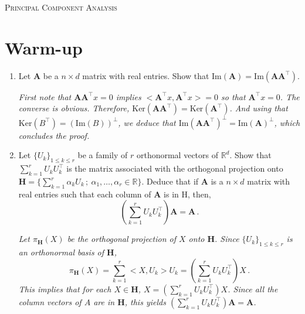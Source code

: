 \documentclass[a4paper,10pt,fleqn]{article}
\newcommand{\eqsp}{\,}
\newcommand{\rset}{\ensuremath{\mathbb{R}}}
\newcommand{\1}{\ensuremath{\mathbbm{1}}}
\newcommand{\bfA}{\mathbf{A}}
\begin{document}

\noindent\hrulefill

\begin{center}
\textsc{Principal Component Analysis}
\end{center}
\hrulefill

\medskip


\section*{Warm-up}

\begin{enumerate}
\item Let $\bfA$ be a $n\times d$ matrix with real entries. Show that $\mathrm{Im}(\bfA)=\mathrm{Im}(\bfA \bfA^\top)$.

\vspace{.2cm}

{\em
    First note that $\bfA\bfA^\top x=0$ implies $<\bfA^\top x,\bfA^\top x>=0$ so that $\bfA^\top x=0$. The converse is obvious. Therefore, $\mathrm{Ker}(\bfA \bfA^\top)= \mathrm{Ker}(\bfA^\top)$. And using that $\mathrm{Ker}(B^\top)=(\mathrm{Im}(B))^\perp$, we deduce that $\mathrm{Im}(\bfA \bfA^\top)^\perp=\mathrm{Im}(\bfA)^\perp$, which concludes the proof.
}
    
\item Let $\{U_k\}_{1\leq k \leq r}$ be a family of $r$ orthonormal vectors of $\rset^d$.
Show that $\sum_{k=1}^{r} U_k U_k^\top$ is the matrix associated with the orthogonal projection onto $\mathbf{H}=\{\sum_{k=1}^r \alpha_k U_k\,; \ \alpha_1,\ldots,\alpha_r \in \rset\}$. Deduce that if $\bfA$ is a $n\times d$ matrix with real entries such that each column of $\bfA$ is in $\mathrm{H}$, then,
$$
\left(\sum_{k=1}^r U_k U_k^\top\right) \bfA=\bfA\eqsp.
$$

\vspace{.2cm}

{\em
Let $\pi_\mathbf{H}(X)$ be the orthogonal projection of $X$ onto $\mathbf{H}$. Since $\{U_k\}_{1\leq k \leq r}$  is an orthonormal basis of $\mathbf{H}$,
$$
\pi_\mathbf{H}(X)=\sum_{k=1}^{r} <X,U_k>U_k=\left(\sum_{k=1}^{r} U_k U_k^\top\right)X\eqsp.
$$
This implies that for each $X \in \mathbf{H}$, $X=\left(\sum_{k=1}^{r} U_k U_k^\top\right)X$. Since all the column vectors of $A$ are in $\mathbf{H}$, this yields $\left(\sum_{k=1}^r U_k U_k^\top\right) \bfA=\bfA$.
}
\end{enumerate}
\end{document}
